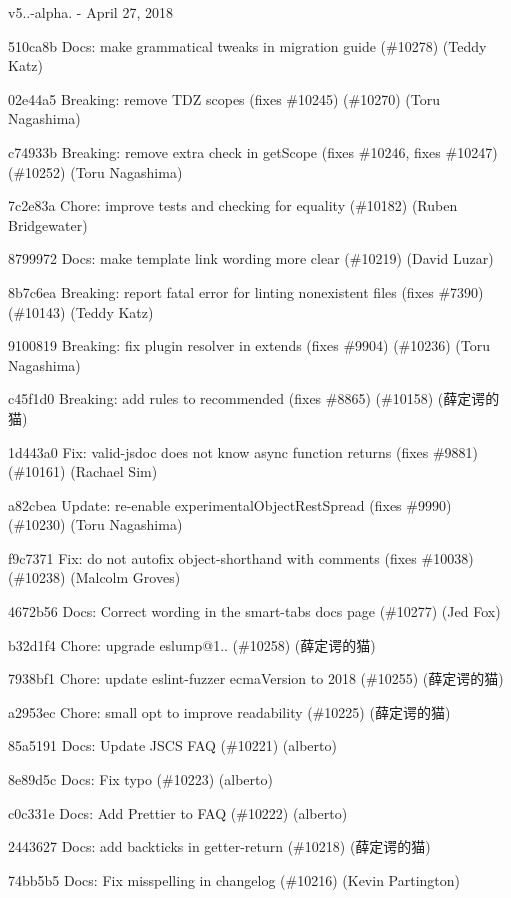 v5..-\/alpha. -\/ April 27, 2018


\begin{DoxyItemize}
\item 510ca8b Docs\+: make grammatical tweaks in migration guide (\#10278) (Teddy Katz)
\item 02e44a5 Breaking\+: remove T\+DZ scopes (fixes \#10245) (\#10270) (Toru Nagashima)
\item c74933b Breaking\+: remove extra check in get\+Scope (fixes \#10246, fixes \#10247) (\#10252) (Toru Nagashima)
\item 7c2e83a Chore\+: improve tests and checking for equality (\#10182) (Ruben Bridgewater)
\item 8799972 Docs\+: make template link wording more clear (\#10219) (David Luzar)
\item 8b7c6ea Breaking\+: report fatal error for linting nonexistent files (fixes \#7390) (\#10143) (Teddy Katz)
\item 9100819 Breaking\+: fix plugin resolver in extends (fixes \#9904) (\#10236) (Toru Nagashima)
\item c45f1d0 Breaking\+: add rules to recommended (fixes \#8865) (\#10158) (薛定谔的猫)
\item 1d443a0 Fix\+: valid-\/jsdoc does not know async function returns (fixes \#9881) (\#10161) (Rachael Sim)
\item a82cbea Update\+: re-\/enable experimental\+Object\+Rest\+Spread (fixes \#9990) (\#10230) (Toru Nagashima)
\item f9c7371 Fix\+: do not autofix object-\/shorthand with comments (fixes \#10038) (\#10238) (Malcolm Groves)
\item 4672b56 Docs\+: Correct wording in the {\ttfamily smart-\/tabs} docs page (\#10277) (Jed Fox)
\item b32d1f4 Chore\+: upgrade eslump@1.. (\#10258) (薛定谔的猫)
\item 7938bf1 Chore\+: update eslint-\/fuzzer ecma\+Version to 2018 (\#10255) (薛定谔的猫)
\item a2953ec Chore\+: small opt to improve readability (\#10225) (薛定谔的猫)
\item 85a5191 Docs\+: Update J\+S\+CS F\+AQ (\#10221) (alberto)
\item 8e89d5c Docs\+: Fix typo (\#10223) (alberto)
\item c0c331e Docs\+: Add Prettier to F\+AQ (\#10222) (alberto)
\item 2443627 Docs\+: add backticks in getter-\/return (\#10218) (薛定谔的猫)
\item 74bb5b5 Docs\+: Fix misspelling in changelog (\#10216) (Kevin Partington)
\end{DoxyItemize}

